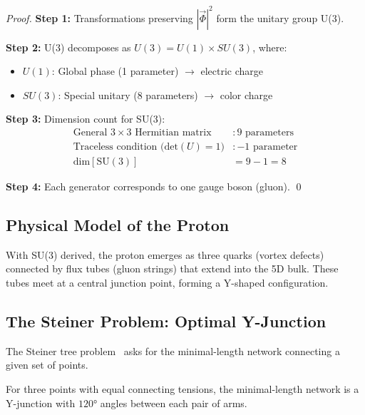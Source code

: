 \begin{proof}
\textbf{Step 1:} Transformations preserving $|\vec{\Phi}|^2$ form the unitary group U(3).

\textbf{Step 2:} U(3) decomposes as $U(3) = U(1) \times SU(3)$, where:
\begin{itemize}
    \item $U(1)$: Global phase (1 parameter) $\to$ electric charge
    \item $SU(3)$: Special unitary (8 parameters) $\to$ color charge
\end{itemize}

\textbf{Step 3:} Dimension count for SU(3):
\begin{align}
\text{General } 3\times 3 \text{ Hermitian matrix} &: 9 \text{ parameters} \\
\text{Traceless condition (det}(U) = 1) &: -1 \text{ parameter} \\
\text{dim}[\text{SU}(3)] &= 9 - 1 = 8
\label{eq:ch2_su3_dimension}
\end{align}

\textbf{Step 4:} Each generator corresponds to one gauge boson (gluon). \qed
\end{proof}

\subsection{Physical Model of the Proton}

With SU(3) derived, the proton emerges as three quarks (vortex defects) connected by
flux tubes (gluon strings) that extend into the 5D bulk. These tubes meet at a central
junction point, forming a Y-shaped configuration.

\subsection{The Steiner Problem: Optimal Y-Junction}

The Steiner tree problem~\cite{HwangRichardsWinter1992} asks for the minimal-length network
connecting a given set of points.

\begin{theorem}
\label{thm:ch2_steiner}
\tagM{}
For three points with equal connecting tensions, the minimal-length network is a Y-junction
with $120°$ angles between each pair of arms.
\end{theorem}

